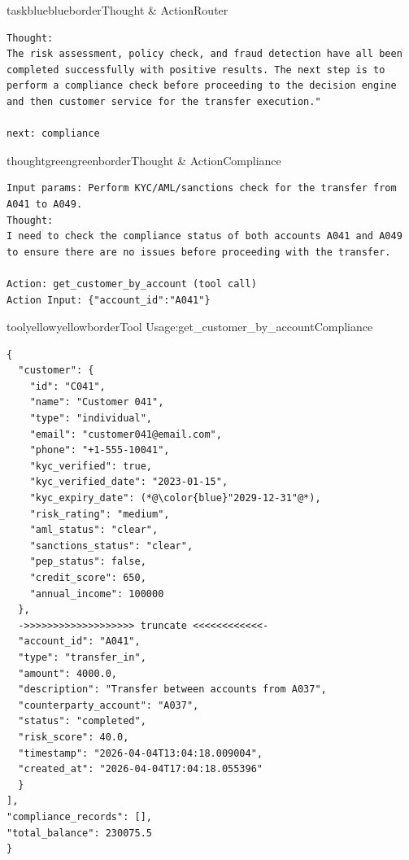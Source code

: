 \begin{agentbox}{taskblue}{blueborder}{Thought \& Action}{Router}
\begin{lstlisting}[style=myprompt]
Thought:
The risk assessment, policy check, and fraud detection have all been completed successfully with positive results. The next step is to perform a compliance check before proceeding to the decision engine and then customer service for the transfer execution."

next: compliance

\end{lstlisting}
\end{agentbox}

\begin{agentbox}{thoughtgreen}{greenborder}{Thought \& Action}{Compliance}
\begin{lstlisting}[style=myprompt]
Input params: Perform KYC/AML/sanctions check for the transfer from A041 to A049.
Thought: 
I need to check the compliance status of both accounts A041 and A049 to ensure there are no issues before proceeding with the transfer.

Action: get_customer_by_account (tool call)
Action Input: {"account_id":"A041"}
\end{lstlisting}
\end{agentbox}

\begin{agentbox}{toolyellow}{yellowborder}{Tool Usage:get\_customer\_by\_account}{Compliance}
\begin{lstlisting}[style=myprompt]
{
  "customer": {
    "id": "C041",
    "name": "Customer 041",
    "type": "individual",
    "email": "customer041@email.com",
    "phone": "+1-555-10041",
    "kyc_verified": true,
    "kyc_verified_date": "2023-01-15",
    "kyc_expiry_date": (*@\color{blue}"2029-12-31"@*),
    "risk_rating": "medium",
    "aml_status": "clear",
    "sanctions_status": "clear",
    "pep_status": false,
    "credit_score": 650,
    "annual_income": 100000
  },
  ->>>>>>>>>>>>>>>>>>> truncate <<<<<<<<<<<<-
  "account_id": "A041",
  "type": "transfer_in",
  "amount": 4000.0,
  "description": "Transfer between accounts from A037",
  "counterparty_account": "A037",
  "status": "completed",
  "risk_score": 40.0,
  "timestamp": "2026-04-04T13:04:18.009004",
  "created_at": "2026-04-04T17:04:18.055396"
  }
],
"compliance_records": [],
"total_balance": 230075.5
}
\end{lstlisting}
\end{agentbox}

